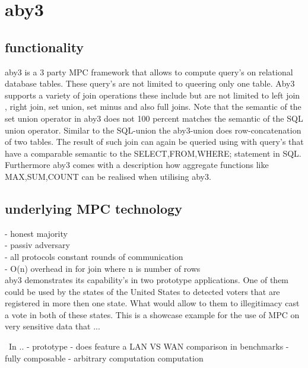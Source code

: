 \section{aby3}


\subsection{functionality }
aby3 is a 3 party MPC framework that allows to compute query's on relational database tables. These query's are not limited to queering only one table. Aby3 supports a variety of join operations these include but are not limited to  left join , right join, set union, set minus and also full joins. Note that the semantic of the set union operator in aby3 does not 100 percent matches the semantic of the SQL union operator. 
Similar to the SQL-union the aby3-union does row-concatenation of two tables.  
The result of such join can again be queried using with query's that have a comparable semantic to the SELECT,FROM,WHERE; statement in SQL. Furthermore aby3 comes with a description how aggregate functions like MAX,SUM,COUNT can be realised when utilising aby3.

\subsection{underlying MPC technology}
- honest majority \\ 
- passiv adversary \\
- all protocols constant rounds of communication \\
- O(n) overhead in for join where n is number of rows \\


aby3 demonstrates its capability's in two prototype applications. One of them could be used by the states of the United States to detected voters that are registered in more then one state. What would allow to them to illegitimacy cast a vote in both of these states. This is a showcase example for the use of MPC on very sensitive data that ...





\
In \cite{10.1145/3372297.3423358} ..
-  prototype 
- does feature a LAN VS WAN comparison in benchmarks
- fully  composable
- arbitrary computation computation  